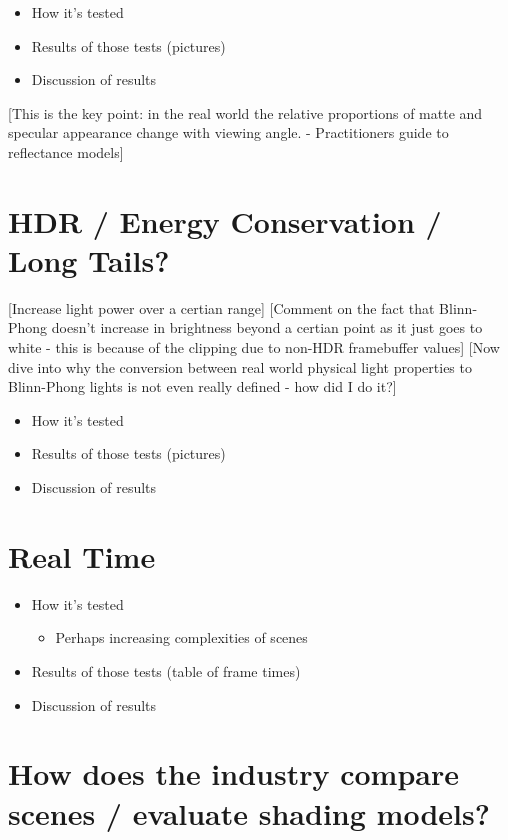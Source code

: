 \begin{itemize}
	\item How it's tested
	\item Results of those tests (pictures)
	\item Discussion of results
\end{itemize}

[This is the key point: in the real world the relative proportions of matte and specular appearance change with viewing
angle. - Practitioners guide to reflectance models]

\section{HDR / Energy Conservation / Long Tails?}

[Increase light power over a certian range]
[Comment on the fact that Blinn-Phong doesn't increase in brightness beyond a certian point as it just goes to white - this is because of the clipping due to non-HDR framebuffer values]
[Now dive into why the conversion between real world physical light properties to Blinn-Phong lights is not even really defined - how did I do it?]

\begin{itemize}
	\item How it's tested
	\item Results of those tests (pictures)
	\item Discussion of results
\end{itemize}

\section{Real Time}

\begin{itemize}
	\item How it's tested
	\begin{itemize}
		\item Perhaps increasing complexities of scenes
	\end{itemize}
	\item Results of those tests (table of frame times)
	\item Discussion of results
\end{itemize}

\section{How does the industry compare scenes / evaluate shading models?}

